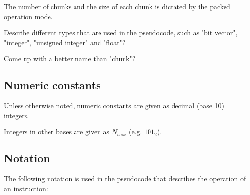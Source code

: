 The number of chunks and the size of each chunk is dictated by the packed
operation mode.

\begin{todobox}
Describe different types that are used in the pseudocode, such as
"bit vector", "integer", "unsigned integer" and "float"?

Come up with a better name than "chunk"?
\end{todobox}

\subsection{Numeric constants}

Unless otherwise noted, numeric constants are given as decimal (base 10)
integers.

Integers in other bases are given as $N_{base}$ (e.g. $101_{2}$).

\subsection{Notation}

The following notation is used in the pseudocode that describes the operation
of an instruction:


